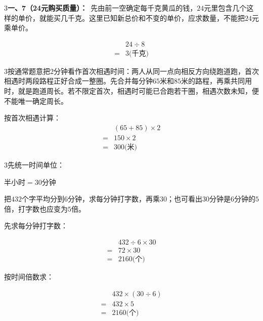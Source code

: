 \documentclass[multi=snippet,border={5bp 20bp 5bp 5bp}]{standalone}
\newenvironment{snippet}[3]{\begin{minipage}{#1bp}\color{answerred}\fontsize{#2}{#3}\selectfont\raggedright}{\end{minipage}}
\begin{document}
\begin{snippet}{505}{11.5}{14}\begin{multicols}{3}\raggedcolumns \textbf{一、7（24元购买质量）：}\ 先由前一空确定每千克黄瓜的钱，\(24\)\allowbreak 元里包含几个这样的单价，就能买几千克。这里已知新总价和不变的单价，应求数量，不能把\(24\)\allowbreak 元乘单价。\par \[\begin{aligned}&24\div8\\={}&3\text{(千克)}\end{aligned}\]\end{multicols}\end{snippet}
\begin{snippet}{505}{11.5}{14}\begin{multicols}{3}\raggedcolumns 按通常题意把\(2\)\allowbreak 分钟看作首次相遇时间：两人从同一点向相反方向绕跑道跑，首次相遇时两段路程正好合成一整圈。先合并每分钟\(65\)\allowbreak 米和\(85\)\allowbreak 米的路程，再乘共同用时，就是跑道周长。若不限定首次，相遇时可能已合跑若干圈，相遇次数未知，便不能唯一确定周长。\par 按首次相遇计算：\[\begin{aligned}&(65+85)\times2\\={}&150\times2\\={}&300\text{(米)}\end{aligned}\]\end{multicols}\end{snippet}
\begin{snippet}{505}{11.5}{14}\begin{multicols}{3}\raggedcolumns 先统一时间单位：\par\noindent\(\displaystyle \text{半小时}=30\text{分钟}\)\allowbreak \par 把\(432\)\allowbreak 个字平均分到\(6\)\allowbreak 分钟，求每分钟打字数，再乘\(30\)\allowbreak ；也可看出\(30\)\allowbreak 分钟是\(6\)\allowbreak 分钟的\(5\)\allowbreak 倍，打字数也应变为\(5\)\allowbreak 倍。\par 先求每分钟打字数：\par\noindent\[\displaystyle \begin{aligned}&432\div6\times30\\={}&72\times30\\={}&2160\text{(个)}\end{aligned}\]\par 按时间倍数求：\par\noindent\[\displaystyle \begin{aligned}&432\times(30\div6)\\={}&432\times5\\={}&2160\text{(个)}\end{aligned}\]\par\end{multicols}\end{snippet}
\end{document}
